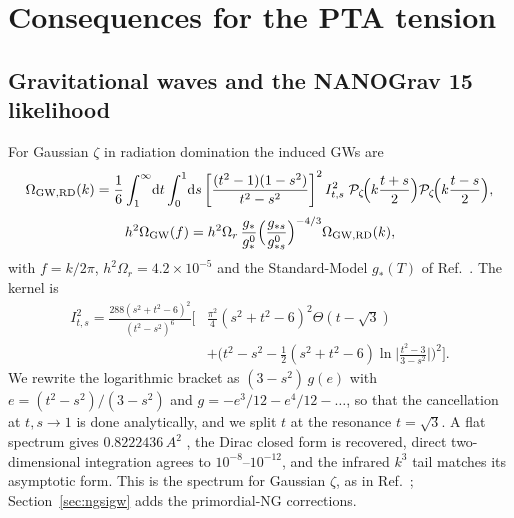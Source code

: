\documentclass{article}
\newcommand{\dd}{\mathrm{d}}
\newcommand{\Pz}{\mathcal{P}_\zeta}
\begin{document}
\section{Consequences for the PTA tension}\label{sec:pta}

\subsection{Gravitational waves and the NANOGrav 15 likelihood}

For Gaussian $\zeta$ in radiation domination the induced GWs are \cite{Kohri,Espinosa,FIVT23}
\begin{equation}
\Omega_{\rm GW,RD}(k)=\frac16\int_1^\infty\!\dd t\int_0^1\!\dd s\left[\frac{(t^2-1)(1-s^2)}{t^2-s^2}\right]^2
I^2_{t,s}\;\Pz\!\Big(k\frac{t+s}{2}\Big)\Pz\!\Big(k\frac{t-s}{2}\Big),
\label{eq:omegard}
\end{equation}
\begin{equation}
h^2\Omega_{\rm GW}(f)=h^2\Omega_r\,\frac{g_*}{g_*^0}\Big(\frac{g_{*s}}{g_{*s}^0}\Big)^{-4/3}\Omega_{\rm GW,RD}(k),
\end{equation}
with $f=k/2\pi$, $h^2\Omega_r=4.2\times10^{-5}$ and the Standard-Model $g_*(T)$ of
Ref.~\cite{Saikawa}. The kernel is \cite{Kohri,FIVT23}
\begin{equation}
\begin{split}
I^2_{t,s}=\frac{288(s^2+t^2-6)^2}{(t^2-s^2)^6}\bigg[&\frac{\pi^2}{4}(s^2+t^2-6)^2\Theta(t-\sqrt3)\\
&+\Big(t^2-s^2-\tfrac12(s^2+t^2-6)\ln\Big|\frac{t^2-3}{3-s^2}\Big|\Big)^2\bigg].
\end{split}
\end{equation}
We rewrite the logarithmic bracket as $(3-s^2)\,g(e)$ with $e=(t^2-s^2)/(3-s^2)$ and
$g=-e^3/12-e^4/12-\dots$, so that the cancellation at $t,s\to1$ is done analytically, and we split
$t$ at the resonance $t=\sqrt3$. A flat spectrum gives $0.8222436\,A^2$ \cite{Kohri}, the Dirac
closed form is recovered, direct two-dimensional integration agrees to $10^{-8}$--$10^{-12}$, and
the infrared $k^3$ tail matches its asymptotic form. This is the spectrum for Gaussian $\zeta$, as
in Ref.~\cite{FIVT23}; Section~\ref{sec:ngsigw} adds the primordial-NG corrections.
\end{document}
